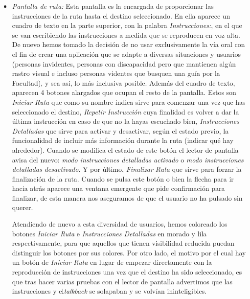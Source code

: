 \begin{itemize}
	\item \textit{Pantalla de ruta:} Esta pantalla es la encargada de proporcionar las instrucciones de la ruta hasta el destino seleccionado. En ella aparece un cuadro de texto en la parte superior, con la palabra \textit{Instrucciones:}, en el que se van escribiendo las instrucciones a medida que se reproducen en voz alta. De nuevo hemos tomado la decisión de no usar exclusivamente la vía oral con el fin de crear una aplicación que se adapte a diversas situaciones y usuarios (personas invidentes, personas con discapacidad pero que mantienen algún rastro visual e incluso personas videntes que busquen una guía por la Facultad), y sea así, lo más inclusiva posible. Además del cuadro de texto, aparecen 4 botones alargados que ocupan el resto de la pantalla. Estos son \textit{Iniciar Ruta} que como su nombre indica sirve para comenzar una vez que has seleccionado el destino, \textit{Repetir Instrucción} cuya finalidad es volver a dar la última instrucción en caso de que no la hayas escuchado bien, \textit{Instrucciones Detalladas} que sirve para activar y desactivar, según el estado previo, la funcionalidad de incluir más información durante la ruta (indicar qué hay alrededor). Cuando se modifica el estado de este botón el lector de pantalla avisa del nuevo: \textit{modo instrucciones detalladas activado} o \textit{modo instrucciones detalladas desactivado}. Y por último, \textit{Finalizar Ruta} que sirve para forzar la finalización de la ruta. Cuando se pulsa este botón o bien la flecha para ir hacia atrás aparece una ventana emergente que pide confirmación para finalizar, de esta manera nos aseguramos de que el usuario no ha pulsado sin querer. 
	
	Atendiendo de nuevo a esta diversidad de usuarios, hemos coloreado los botones \textit{Iniciar Ruta} e \textit{Instrucciones Detalladas} en morado y lila respectivamente, para que aquellos que tienen visibilidad reducida puedan distinguir los botones por sus colores. Por otro lado, el motivo por el cual hay un botón de \textit{Iniciar Ruta} en lugar de empezar directamente con la reproducción de instrucciones una vez que el destino ha sido seleccionado, es que tras hacer varias pruebas con el lector de pantalla advertimos que las instrucciones y el\textit{talkback} se solapaban y se volvían ininteligibles.
	

\end{itemize}

